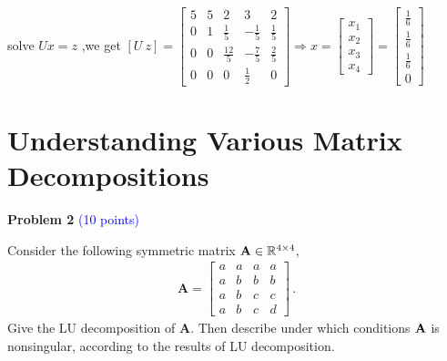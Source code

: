 \documentclass[english,onecolumn]{IEEEtran}
\begin{document}
\begin{enumerate}
\\solve $ Ux=z $ ,we get $ \left[U \ z\right]=\left[\begin{array}{cccc|c}5 & 5 & 2 & 3 & 2 \\ 0 & 1 & \frac{1}{5} & -\frac{1}{5} & \frac{1}{5} \\ 0 & 0 & \frac{12}{5} & -\frac{7}{5} & \frac{2}{5} \\ 0 & 0 & 0 & \frac{1}{2} & 0\end{array}\right] \Rightarrow x=\left[\begin{array}{l}x_{1} \\ x_{2} \\ x_{3} \\ x_{4}\end{array}\right]=\left[\begin{array}{c}\frac{1}{6} \\ \frac{1}{6} \\ \frac{1}{6} \\ 0\end{array}\right]$
\end{enumerate}

\newpage
\section{Understanding Various Matrix Decompositions}
\noindent\textbf{Problem 2} \textcolor{blue}{(10 points)}

\noindent Consider the following symmetric matrix ${\bf A}\in \mathbb{R}^{4\times 4}$,
	\begin{align*}
		\mathbf{A}=
		\begin{bmatrix}
			a&a&a&a\\
			a&b&b&b\\
			a&b&c&c\\
			a&b&c&d
		\end{bmatrix}\,.
	\end{align*}
Give the LU decomposition of $\mathbf{A}$.
Then describe under which conditions $\bf{A}$ is nonsingular, according to the results of LU decomposition.
\end{document}

